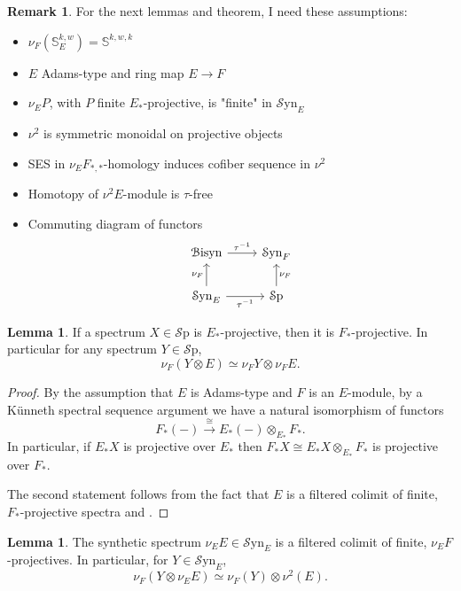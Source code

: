 \documentclass[10pt]{amsart}
\theoremstyle{definition}
\numberwithin{figure}{section}
\numberwithin{equation}{section}
\newtheorem{lem}[figure]{Lemma}
\newtheorem{rem}[figure]{Remark}
\theoremstyle{cited}
\newcommand{\Sp}{{\mathcal{S}\mathrm{p}}}
\newcommand{\Syn}{\mathcal{S}\mathrm{yn}}
\newcommand{\Bisyn}{\mathcal{B}\mathrm{isyn}}
\begin{document}
\begin{rem}
For the next lemmas and theorem, I need these assumptions:
\begin{itemize}
\item $\nu_F(\mathbb{S}^{k,w}_E) = \mathbb{S}^{k,w,k}$
\item $E$ Adams-type and ring map $E\to F$
\item $\nu_EP$, with $P$ finite $E_*$-projective, is "finite" in $\Syn_E$
\item $\nu^2$ is symmetric monoidal on projective objects
\item SES in $\nu_EF_{*,*}$-homology induces cofiber sequence in $\nu^2$
\item Homotopy of $\nu^2E$-module is $\tau$-free
\item Commuting diagram of functors
\begin{equation*}
\begin{tikzcd}
\Bisyn \arrow[r,"\tau^{-1}"]           & \Syn_F        \\
\Syn_E \arrow[u,"\nu_F"] \arrow[r,"\tau^{-1}"'] & \Sp \arrow[u,"\nu_F"']
\end{tikzcd}
\end{equation*}
\end{itemize}
\end{rem}

\begin{lem}
\label{Fprojlemma}
If a spectrum $X\in\Sp$ is $E_*$-projective, then it is $F_*$-projective. In particular for any spectrum $Y\in\Sp$,
$$
\nu_F(Y\otimes E)\simeq\nu_FY\otimes \nu_FE.
$$
\end{lem}

\begin{proof}
    By the assumption that $E$ is Adams-type and $F$ is an $E$-module, by a K\"unneth spectral sequence argument we have a natural isomorphism of functors
    $$
    F_*(-)\xrightarrow{\cong}E_*(-)\otimes_{E_*}F_*.
    $$
    In particular, if $E_*X$ is projective over $E_*$ then $F_*X\cong E_*X\otimes_{E_*}F_*$ is projective over $F_*$.

    The second statement follows from the fact that $E$ is a filtered colimit of finite, $F_*$-projective spectra and \cite[Lem. 4.24]{Pst22}.
\end{proof}

\begin{lem}
\label{nuFsymmonlemma}
The synthetic spectrum $\nu_EE\in\Syn_E$ is a filtered colimit of finite, $\nu_EF$-projectives. In particular, for $Y\in\Syn_E$, $$\nu_F(Y\otimes\nu_EE)\simeq\nu_F(Y)\otimes\nu^2(E).$$ 
\end{lem}
\end{document}

